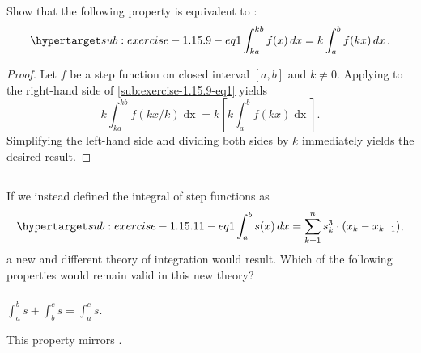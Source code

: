 \documentclass{report}
\begin{document}
  Show that the following property is equivalent to
    :
    \begin{equation}
      \hyperlabel{sub:exercise-1.15.9-eq1}
      \int_{ka}^{kb} f(x) \mathop{dx} = k \int_a^b f(kx) \mathop{dx}.
    \end{equation}

  \begin{proof}
    Let $f$ be a step function on closed interval $[a, b]$ and $k \neq 0$.
    Applying  to
      the right-hand side of \eqref{sub:exercise-1.15.9-eq1} yields
      $$k\int_{ka}^{kb} f(kx / k) \mathop{dx} =
        k\left[k\int_a^b f(kx) \mathop{dx}\right].$$
    Simplifying the left-hand side and dividing both sides by $k$ immediately
      yields the desired result.
  \end{proof}

\subsection{}%

  If we instead defined the integral of step functions as
    \begin{equation*}
      \hyperlabel{sub:exercise-1.15.11-eq1}
      \int_a^b s(x) \mathop{dx} = \sum_{k=1}^n s_k^3 \cdot (x_k - x_{k-1}),
    \end{equation*}
    a new and different theory of integration would result.
  Which of the following properties would remain valid in this new theory?

\subsubsection{}%

  $\int_a^b s + \int_b^c s = \int_a^c s$.

  \begin{note}
    This property mirrors
      .
  \end{note}
\end{document}
